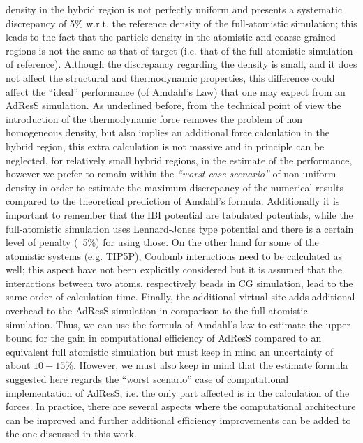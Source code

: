 \documentclass[a4paper,preprint,unsortedaddress]{revtex4-1}
\begin{document}
density in the hybrid region is not perfectly uniform and presents a systematic discrepancy of 5\% w.r.t. the reference density of the full-atomistic simulation; this leads to the fact that the particle density in the
atomistic and coarse-grained regions is not the same as that of target (i.e. that of the full-atomistic simulation of reference). Although the discrepancy regarding the density is small, 
and it does not affect the structural and thermodynamic properties, this difference could affect the ``ideal'' performance (of Amdahl's Law) that one may expect from an AdResS simulation. As underlined before, from the technical point of view the introduction of the thermodynamic force removes the problem of non homogeneous density, but also implies an additional force calculation in the hybrid region, this extra calculation is not massive and in principle can be neglected, for relatively small hybrid regions, in the estimate of the performance, however we prefer to remain within the {\it ``worst case scenario''} of non uniform density in order to estimate the maximum discrepancy of the numerical results compared to the theoretical prediction of Amdahl's formula.
Additionally it is important to remember that the IBI potential are tabulated potentials, while the full-atomistic simulation uses Lennard-Jones type potential and there is a certain level of penalty (~5\%) for using those. 
{On the other hand for some of the atomistic systems (e.g. TIP5P), Coulomb interactions need to be calculated as well; this aspect have not been explicitly considered but it is assumed that the interactions between two atoms, respectively beads in CG simulation, lead to the same order of calculation time.}
{Finally, the additional virtual site adds additional overhead to the AdResS simulation in comparison to the full atomistic simulation.} Thus, we can use the formula of Amdahl's law to estimate the upper bound for the gain in computational efficiency of AdResS compared to an equivalent full atomistic simulation but must keep in mind an uncertainty of about $10-15\%$.
However, we must also keep in mind that the estimate formula suggested here regards the {``worst scenario''} case of computational implementation of AdResS, i.e. the only part affected is in the calculation of the forces. In practice, there are several aspects where the computational architecture can be improved and further additional efficiency improvements can be added to the one discussed in this work.
\end{document}
